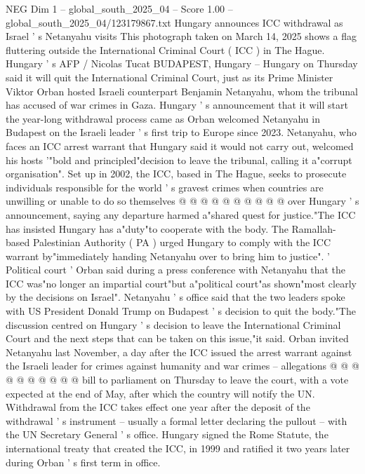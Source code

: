 \begin{textsample}{NEG Dim 1 – global\_south\_2025\_04 – Score 1.00 – global\_south\_2025\_04/123179867.txt}  \label{ex:f1_neg_162}
Hungary announces ICC withdrawal as Israel ' s Netanyahu visits This photograph taken on March 14, 2025 shows a flag fluttering outside the International Criminal Court ( ICC ) in The Hague.
Hungary ' s AFP / Nicolas Tucat BUDAPEST, Hungary -- Hungary on Thursday said it will quit the International Criminal Court, just as its Prime Minister Viktor Orban hosted Israeli counterpart Benjamin Netanyahu, whom the tribunal has accused of war crimes in Gaza.
Hungary ' s announcement that it will start the year-long withdrawal process came as Orban welcomed Netanyahu in Budapest on the Israeli leader ' s first trip to Europe since 2023.
Netanyahu, who faces an ICC arrest warrant that Hungary said it would not carry out, welcomed his hosts '"bold and principled"decision to leave the tribunal, calling it a"corrupt organisation".
Set up in 2002, the ICC, based in The Hague, seeks to prosecute individuals responsible for the world ' s gravest crimes when countries are unwilling or unable to do so themselves @ @ @ @ @ @ @ @ @ @ over Hungary ' s announcement, saying any departure harmed a"shared quest for justice."The ICC has insisted Hungary has a"duty"to cooperate with the body.
The Ramallah-based Palestinian Authority ( PA ) urged Hungary to comply with the ICC warrant by"immediately handing Netanyahu over to bring him to justice". ' Political court ' Orban said during a press conference with Netanyahu that the ICC was"no longer an impartial court"but a"political court"as shown"most clearly by the decisions on Israel".
Netanyahu ' s office said that the two leaders spoke with US President Donald Trump on Budapest ' s decision to quit the body."The discussion centred on Hungary ' s decision to leave the International Criminal Court and the next steps that can be taken on this issue,"it said.
Orban invited Netanyahu last November, a day after the ICC issued the arrest warrant against the Israeli leader for crimes against humanity and war crimes -- allegations @ @ @ @ @ @ @ @ @ @ bill to parliament on Thursday to leave the court, with a vote expected at the end of May, after which the country will notify the UN.
Withdrawal from the ICC takes effect one year after the deposit of the withdrawal ' s instrument -- usually a formal letter declaring the pullout -- with the UN Secretary General ' s office.
Hungary signed the Rome Statute, the international treaty that created the ICC, in 1999 and ratified it two years later during Orban ' s first term in office.

\end{textsample}
